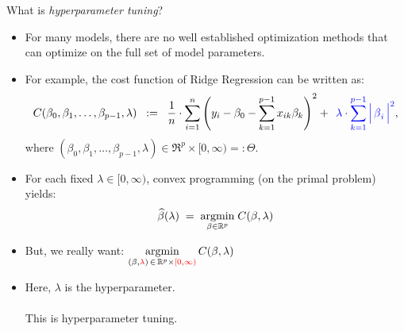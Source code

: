 

\begin{frame}{\Large What is \textit{hyperparameter tuning}?}

\small

\vskip -0.15cm
\begin{itemize}
\pause\item
	For many models, there are no well established optimization methods that
	can optimize on the full set of model parameters.
\pause\item
	{\scriptsize For example, the cost function of Ridge Regression can be written as:}
	{\scriptsize\begin{equation*}
	C(\beta_{0},\beta_{1},\ldots,\beta_{p-1},\lambda)
	\;\; := \;\;
		\dfrac{1}{n}\cdot
		\overset{n}{\underset{i=1}{\sum}}\left(
			y_{i} - \beta_{0} - \overset{p-1}{\underset{k=1}{\sum}}\,x_{ik}\beta_{k}
			\right)^{2}
		+\;\,
		{\color{blue}\lambda\cdot\overset{p-1}{\underset{k=1}{\sum}}\left\vert\,\overset{{\color{white}.}}{\beta}_{i}\,\right\vert^{2}},
	\end{equation*}}
	{\scriptsize where $(\beta_{0},\beta_{1},\ldots,\beta_{p-1},\lambda) \in \Re^{p} \times [0,\infty) =: \Theta$.}
\pause\item
	{\scriptsize For each fixed $\lambda \in [0,\infty)$, convex programming (on the primal problem) yields:}
	{\scriptsize\begin{equation*}
	\widehat{\beta}(\lambda)
	\; = \;
		\underset{\beta \in \Re^{p}}{\textnormal{argmin}}\;C(\beta,\lambda)
	\end{equation*}}
\pause\item
	\vskip -0.5cm
	{\scriptsize But, we really want:
	\;$\underset{(\beta,{\color{red}\lambda}) \,\in\, \Re^{p} \times {\color{red}[0,\infty)}}{\textnormal{argmin}}\,C(\beta,\lambda)$}
\pause\item
	Here, {\color{red}$\lambda$ is the hyperparameter}.\\
	\\
	\pause This is {\color{red}hyperparameter tuning}.
\end{itemize}

\end{frame}
\normalsize


